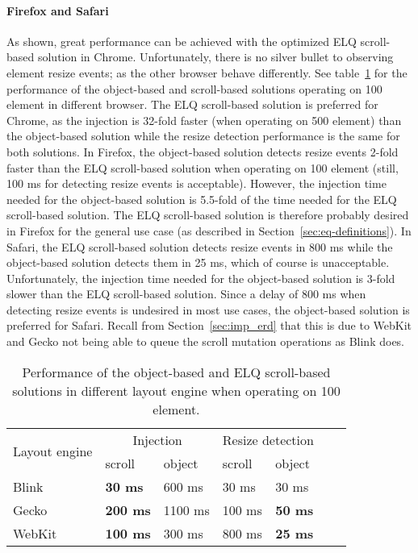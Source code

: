 \documentclass{acm_proc_article-sp}
\newcommand{\glspl}[1]{#1}
\newcommand{\gls}[1]{#1}
\begin{document}
      \paragraph{Firefox and Safari}
      As shown, great performance can be achieved with the optimized \gls{ELQ} scroll-based solution in Chrome.
      Unfortunately, there is no silver bullet to observing element resize events; as the other \glspl{browser} behave differently.
      See table~\ref{table:erd-layout-engines} for the performance of the object-based and scroll-based solutions operating on 100 \glspl{element} in different \glspl{browser}.
      The \gls{ELQ} scroll-based solution is preferred for Chrome, as the injection is 32-fold faster (when operating on 500 \glspl{element}) than the object-based solution while the resize detection performance is the same for both solutions.
      In Firefox, the object-based solution detects resize events 2-fold faster than the \gls{ELQ} scroll-based solution when operating on 100 \glspl{element} (still, 100 ms for detecting resize events is acceptable).
      However, the injection time needed for the object-based solution is 5.5-fold of the time needed for the \gls{ELQ} scroll-based solution.
      The \gls{ELQ} scroll-based solution is therefore probably desired in Firefox for the general use case (as described in Section~\ref{sec:eq-definitions}).
      In Safari, the \gls{ELQ} scroll-based solution detects resize events in 800 ms while the object-based solution detects them in 25 ms, which of course is unacceptable.
      Unfortunately, the injection time needed for the object-based solution is 3-fold slower than the \gls{ELQ} scroll-based solution.
      Since a delay of 800 ms when detecting resize events is undesired in most use cases, the object-based solution is preferred for Safari.
      Recall from Section~\ref{sec:imp_erd} that this is due to WebKit and Gecko not being able to queue the scroll mutation operations as Blink does.
      \begin{table}[ht]\center
        \tiny
        \begin{tabular}[t]{ l l l l l l l }
          \multirow{2}{*}{Layout engine} & \multicolumn{2}{c}{Injection} & \multicolumn{2}{c}{Resize detection} \\
          & scroll & object & scroll & object \\
          \hline
          \gls{Blink}   & \textbf{30 ms}   & 600 ms    & 30 ms   & 30 ms           \\
          \gls{Gecko}   & \textbf{200 ms}  & 1100 ms   & 100 ms  & \textbf{50 ms}  \\
          \gls{WebKit}  & \textbf{100 ms}  & 300 ms    & 800 ms  & \textbf{25 ms}  \\
        \end{tabular}
        \caption{Performance of the object-based and \gls{ELQ} scroll-based solutions in different \glspl{layout engine} when operating on 100 \glspl{element}.}
        \label{table:erd-layout-engines}
      \end{table}
\end{document}

